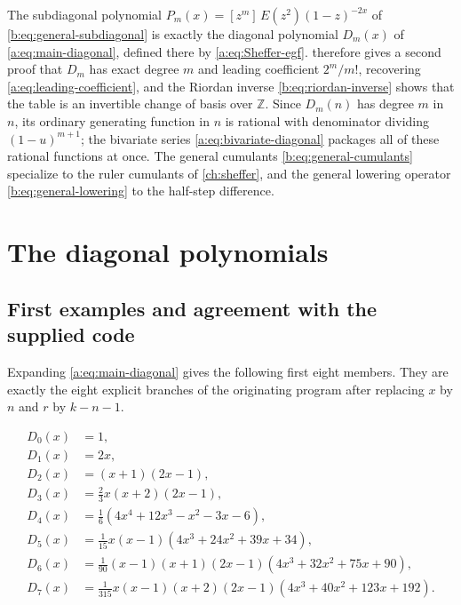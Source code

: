 \documentclass[11pt,a4paper,oneside,openany]{book}
\numberwithin{equation}{chapter}
\theoremstyle{definition}
\theoremstyle{remark}
\newcommand{\Z}{\mathbb Z}
\newcommand{\coeff}[2]{[z^{#1}]\,#2}
\newcommand{\Diag}{D}
\begin{document}
The subdiagonal polynomial $P_m(x)=\coeff{m}{E(z^2)(1-z)^{-2x}}$ of
\eqref{b:eq:general-subdiagonal} is exactly the diagonal polynomial
$\Diag_m(x)$ of \eqref{a:eq:main-diagonal}, defined there by
\eqref{a:eq:Sheffer-egf}.  therefore
gives a second proof that $\Diag_m$ has exact degree $m$ and leading
coefficient $2^m/m!$, recovering \eqref{a:eq:leading-coefficient}, and the
Riordan inverse \eqref{b:eq:riordan-inverse} shows that the table is an
invertible change of basis over $\Z$. Since $\Diag_m(n)$ has degree $m$ in
$n$, its ordinary generating function in $n$ is rational with denominator
dividing $(1-u)^{m+1}$; the bivariate series \eqref{a:eq:bivariate-diagonal}
packages all of these rational functions at once. The general cumulants
\eqref{b:eq:general-cumulants} specialize to the ruler cumulants of
\cref{ch:sheffer}, and the general lowering operator
\eqref{b:eq:general-lowering} to the half-step difference.

\chapter{The diagonal polynomials}\label{ch:diagonal}

\section{First examples and agreement with the supplied code}

Expanding \eqref{a:eq:main-diagonal} gives the following first eight members.
They are exactly the eight explicit branches of the originating program after replacing
\(x\) by \(n\) and \(r\) by \(k-n-1\).

\begin{align}
 \Diag_0(x)&=1,\label{a:eq:D0}\\
 \Diag_1(x)&=2x,\label{a:eq:D1}\\
 \Diag_2(x)&=(x+1)(2x-1),\label{a:eq:D2}\\
 \Diag_3(x)&=\frac{2}{3}x(x+2)(2x-1),\label{a:eq:D3}\\
 \Diag_4(x)&=\frac{1}{6}
 (4x^4+12x^3-x^2-3x-6),\label{a:eq:D4}\\
 \Diag_5(x)&=\frac{1}{15}x(x-1)
 (4x^3+24x^2+39x+34),\label{a:eq:D5}\\
 \Diag_6(x)&=\frac{1}{90}(x-1)(x+1)(2x-1)
 (4x^3+32x^2+75x+90),\label{a:eq:D6}\\
 \Diag_7(x)&=\frac{1}{315}x(x-1)(x+2)(2x-1)
 (4x^3+40x^2+123x+192).\label{a:eq:D7}
\end{align}
\end{document}

